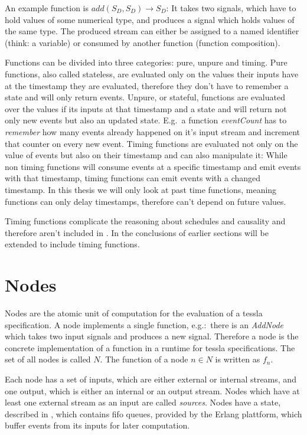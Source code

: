 An example function is \(\mathit{add}(S_D,S_D) \rightarrow S_D\): It takes two signals, which have to hold values of some numerical type, and produces a signal which holds values of the same type.
The produced stream can either be assigned to a named identifier (think: a variable) or consumed by another function (function composition).

Functions can be divided into three categories: pure, unpure and timing.
Pure functions, also called stateless, are evaluated only on the values their inputs have at the timestamp they are evaluated, therefore they don't have to remember a state and will only return events.
Unpure, or stateful, functions are evaluated over the values if its inputs at that timestamp and a state and will return not only new events but also an updated state.
E.g.\ a function \emph{eventCount} has to \emph{remember} how many events already happened on it's input stream and increment that counter on every new event.
Timing functions are evaluated not only on the value of events but also on their timestamp and can also manipulate it:
While non timing functions will consume events at a specific timestamp and emit events with that timestamp, timing functions can emit events with a changed timestamp.
In this thesis we will only look at past time functions, meaning functions can only delay timestamps, therefore can't depend on future values.

Timing functions complicate the reasoning about schedules and causality and therefore aren't included in .
In  the conclusions of earlier sections will be extended to include timing functions.

\section{Nodes}
\label{sec:definitions:nodes}

Nodes are the atomic unit of computation for the evaluation of a \gls{tessla} specification.
A node implements a single function, e.g.:\ there is an \emph{AddNode} which takes two input signals and produces a new signal.
Therefore a node is the concrete implementation of a function in a runtime for \gls{tessla} specifications.
The set of all nodes is called \(N\).
The function of a node \(n \in N\) is written as \(f_n\).

Each node has a set of inputs, which are either external or internal streams, and one output, which is either an internal or an output stream.
Nodes which have at least one external stream as an input are called \emph{sources}.
Nodes have a state, described in , which contains \gls{fifo} queues, provided by the Erlang plattform, which buffer events from its inputs for later computation.

